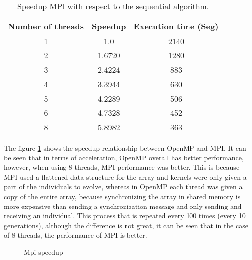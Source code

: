 \documentclass{IEEEtran}
\begin{document}

\begin{table}[h]
  \centering
  \begin{tabular}{|c|c|c|}
    \hline
    \textbf{Number of threads} & \textbf{Speedup} & \textbf{Execution time (Seg)} \\ \hline
    1                          & 1.0              & 2140                          \\
    2                          & 1.6720           & 1280                          \\
    3                          & 2.4224           & 883                           \\
    4                          & 3.3944           & 630                           \\
    5                          & 4.2289           & 506                           \\
    6                          & 4.7328           & 452                           \\
    8                          & 5.8982           & 363                           \\ \hline
  \end{tabular}
  \caption{Speedup MPI with respect to the sequential algorithm.}
  \label{tab:mpi}
\end{table}


The figure \ref{fig:mpi speed} shows the speedup relationship between OpenMP and MPI. It can be seen that in terms of acceleration, OpenMP overall has better performance, however, when using 8 threads, MPI performance was better. This is because MPI used a flattened data structure for the array and kernels were only given a part of the individuals to evolve, whereas in OpenMP each thread was given a copy of the entire array, because synchronizing the array in shared memory is more expensive than sending a synchronization message and only sending and receiving an individual. This process that is repeated every 100 times (every 10 generations), although the difference is not great, it can be seen that in the case of 8 threads, the performance of MPI is better.

\begin{figure}[ht]
  \centering
  
  \caption{Mpi speedup}
  \label{fig:mpi speed}
\end{figure}
\end{document}
